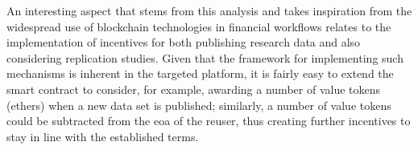 An interesting aspect that stems from this analysis and takes inspiration from the widespread use of blockchain technologies in financial workflows relates to the implementation of incentives for both publishing research data and also considering replication studies. Given that the framework for implementing such mechanisms is inherent in the targeted platform, it is fairly easy to extend the smart contract to consider, for example, awarding a number of value tokens (ethers) when a new data set is published; similarly, a number of value tokens could be subtracted from the \gls{eoa} of the reuser, thus creating further incentives to stay in line with the established terms.